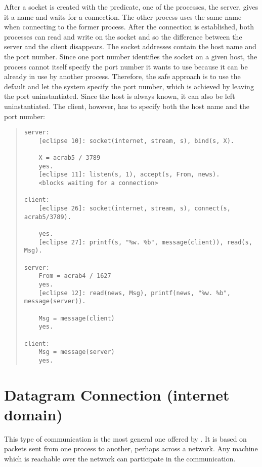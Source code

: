 After a socket is created with the  predicate,
one of the processes, the server, gives it a name
and waits for a connection.
The other process uses the same name when connecting to
the former process.
After the connection is established, both processes can read and write
on the socket and so the difference between the server and the
client disappears.
The socket addresses contain the host name and the port number.
Since one port number identifies the socket on a given host,
the process cannot itself specify the port number it wants to use
because it can be already in use by another process.
Therefore, the safe approach is to use the default and let the system
specify the port number, which is achieved by leaving the port
uninstantiated.
Since the host is always known,
it can also be left uninstantiated.
The client, however, has to specify both the host name and the port number:
\begin{quote}
\begin{verbatim}
server:
    [eclipse 10]: socket(internet, stream, s), bind(s, X).

    X = acrab5 / 3789
    yes.
    [eclipse 11]: listen(s, 1), accept(s, From, news).
    <blocks waiting for a connection>

client:
    [eclipse 26]: socket(internet, stream, s), connect(s, acrab5/3789).

    yes.
    [eclipse 27]: printf(s, "%w. %b", message(client)), read(s, Msg).

server:
    From = acrab4 / 1627 
    yes.
    [eclipse 12]: read(news, Msg), printf(news, "%w. %b", message(server)).

    Msg = message(client)
    yes.

client:
    Msg = message(server)
    yes.
\end{verbatim}
\end{quote}

\section{Datagram Connection (internet domain)}
This type of communication is the most general one offered by {\eclipse}.
It is based on packets sent from one process to another, perhaps across
a network. Any machine which is reachable over
the network can participate in the communication.

